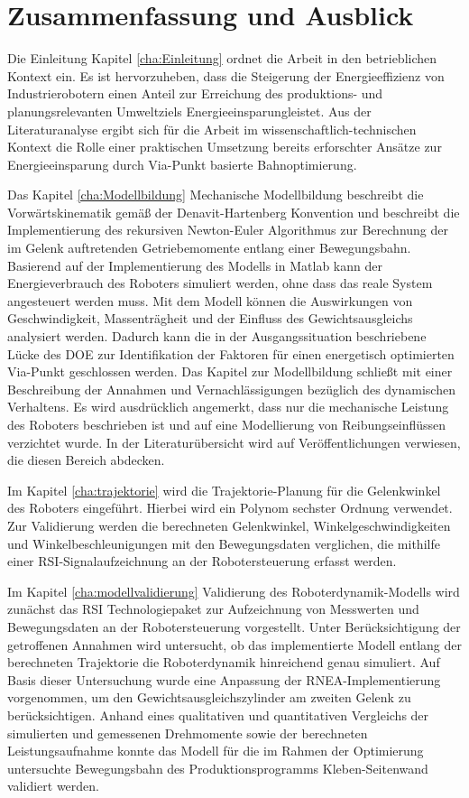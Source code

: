\chapter{Zusammenfassung und Ausblick}
Die Einleitung Kapitel \ref{cha:Einleitung} ordnet die Arbeit in den betrieblichen Kontext ein. Es ist hervorzuheben, dass die Steigerung der Energieeffizienz von Industrierobotern einen Anteil zur Erreichung des produktions- und planungsrelevanten Umweltziels \glqq Energieeinsparung\grqq leistet. Aus der Literaturanalyse ergibt sich für die Arbeit im wissenschaftlich-technischen Kontext die Rolle einer praktischen Umsetzung bereits erforschter Ansätze zur Energieeinsparung durch Via-Punkt basierte Bahnoptimierung.

Das Kapitel \ref{cha:Modellbildung} Mechanische Modellbildung beschreibt die Vorwärtskinematik gemäß der Denavit-Hartenberg Konvention und beschreibt die Implementierung des rekursiven Newton-Euler Algorithmus zur Berechnung der im Gelenk auftretenden Getriebemomente entlang einer Bewegungsbahn. Basierend auf der Implementierung des Modells in Matlab kann der Energieverbrauch des Roboters simuliert werden, ohne dass das reale System angesteuert werden muss. Mit dem Modell können die Auswirkungen von Geschwindigkeit, Massenträgheit und der Einfluss des Gewichtsausgleichs analysiert werden. Dadurch kann die in der Ausgangssituation beschriebene Lücke des DOE zur Identifikation der Faktoren für einen energetisch optimierten Via-Punkt geschlossen werden. Das Kapitel zur Modellbildung schließt mit einer Beschreibung der Annahmen und Vernachlässigungen bezüglich des dynamischen Verhaltens. Es wird ausdrücklich angemerkt, dass nur die mechanische Leistung des Roboters beschrieben ist und auf eine Modellierung von Reibungseinflüssen verzichtet wurde. In der Literaturübersicht wird auf Veröffentlichungen verwiesen, die diesen Bereich abdecken.

Im Kapitel \ref{cha:trajektorie} wird die Trajektorie-Planung für die Gelenkwinkel des Roboters eingeführt. Hierbei wird ein Polynom sechster Ordnung verwendet. Zur Validierung werden die berechneten Gelenkwinkel, Winkelgeschwindigkeiten und Winkelbeschleunigungen mit den Bewegungsdaten verglichen, die mithilfe einer RSI-Signalaufzeichnung an der Robotersteuerung erfasst werden.

Im Kapitel \ref{cha:modellvalidierung} Validierung des Roboterdynamik-Modells wird zunächst das RSI Technologiepaket zur Aufzeichnung von Messwerten und Bewegungsdaten an der Robotersteuerung vorgestellt. Unter Berücksichtigung der getroffenen Annahmen wird untersucht, ob das implementierte Modell entlang der berechneten Trajektorie die Roboterdynamik hinreichend genau simuliert. Auf Basis dieser Untersuchung wurde eine Anpassung der RNEA-Implementierung vorgenommen, um den Gewichtsausgleichszylinder am zweiten Gelenk zu berücksichtigen. Anhand eines qualitativen und quantitativen Vergleichs der simulierten und gemessenen Drehmomente sowie der berechneten Leistungsaufnahme konnte das Modell für die im Rahmen der Optimierung untersuchte Bewegungsbahn des Produktionsprogramms  Kleben-Seitenwand validiert werden.

